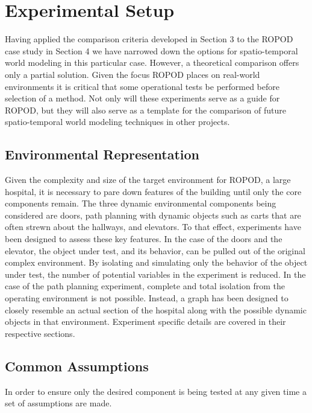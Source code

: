 

  \chapter{Experimental Setup}

  Having applied the comparison criteria developed in Section 3 to the ROPOD case
  study in Section 4 we have narrowed down the options for spatio-temporal
  world modeling in this particular case. However, a theoretical comparison offers
  only a partial solution. Given the focus ROPOD places on real-world
  environments it is critical that some operational tests be performed before
  selection of a method. Not only will these experiments serve as a guide for ROPOD,
  but they will also serve as a template for the comparison of future
  spatio-temporal world modeling techniques in other projects. \\

  \section{ Environmental Representation}

  Given the complexity and size of the target environment for ROPOD, a large
  hospital, it is necessary to pare down features of the building until only
  the core components remain. The three dynamic environmental components being
  considered are doors, path planning with dynamic objects such as carts that are often strewn about the
  hallways, and elevators.
  To that effect, experiments have been designed to assess these key features.
  In the case of the doors and the elevator, the object under test, and its
  behavior, can be pulled out of the original complex environment. By
  isolating and simulating only the behavior of the object under test, the
  number of potential variables in the experiment is reduced.
  In the case of the path planning experiment, complete and total isolation from the operating
  environment is not possible. Instead, a graph has been designed to closely
  resemble an actual section of the hospital along with the possible dynamic objects
  in that environment. Experiment specific details are covered in their respective sections. \\


  \section{ Common Assumptions }
  In order to ensure only the desired component is being tested at any given
  time a set of assumptions are made.

